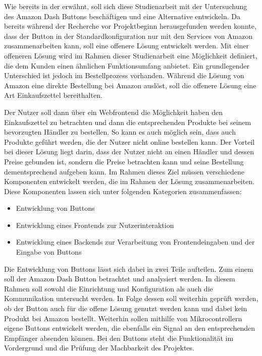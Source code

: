 Wie bereits in der  erwähnt, soll sich diese Studienarbeit mit der Untersuchung des Amazon Dash Buttons beschäftigen und eine Alternative entwickeln. Da bereits während der Recherche vor Projektbeginn herausgefunden werden konnte, dass der Button in der Standardkonfiguration nur mit den Services von Amazon zusammenarbeiten kann, soll eine offenere Lösung entwickelt werden. Mit einer offeneren Lösung wird im Rahmen dieser Studienarbeit eine Möglichkeit definiert, die dem Kunden einen ähnlichen Funktionsumfang anbietet. Ein grundlegender Unterschied ist jedoch im Bestellprozess vorhanden. Während die Lösung von Amazon eine direkte Bestellung bei Amazon auslöst, soll die offenere Lösung eine Art Einkaufszettel bereithalten. 

Der Nutzer soll dann über ein Webfrontend die Möglichkeit haben den Einkaufszettel zu betrachten und dann die entsprechenden Produkte bei seinem bevorzugten Händler zu bestellen. So kann es auch möglich sein, dass auch Produkte geführt werden, die der Nutzer nicht online bestellen kann. Der Vorteil bei dieser Lösung liegt darin, dass der Nutzer nicht an einen Händler und dessen Preise gebunden ist, sondern die Preise betrachten kann und seine Bestellung dementsprechend aufgeben kann. 
Im Rahmen dieses Ziel müssen verschiedene Komponenten entwickelt werden, die im Rahmen der Lösung zusammenarbeiten. Diese Komponenten lassen sich unter folgenden Kategorien zusammenfassen:
\begin{itemize}
\item Entwicklung von Buttons 
\item Entwicklung eines Frontends zur Nutzerinteraktion
\item Entwicklung eines Backends zur Verarbeitung von Frontendeingaben und der Eingabe von Buttons 
\end{itemize}
Die Entwicklung von Buttons lässt sich dabei in zwei Teile aufteilen. Zum einem soll der Amazon Dash Button betrachtet und analysiert werden. In diesem Rahmen soll sowohl die Einrichtung und Konfiguration als auch die Kommunikation untersucht werden. In Folge dessen soll weiterhin geprüft werden, ob der Button auch für die offene Lösung genutzt werden kann und dabei kein Produkt bei Amazon bestellt. Weiterhin sollen mithilfe von Mikrocontrollern eigene Buttons entwickelt werden, die ebenfalls ein Signal an den entsprechenden Empfänger absenden können. Bei den Buttons steht die Funktionalität im Vordergrund und die Prüfung der Machbarkeit des Projektes.


